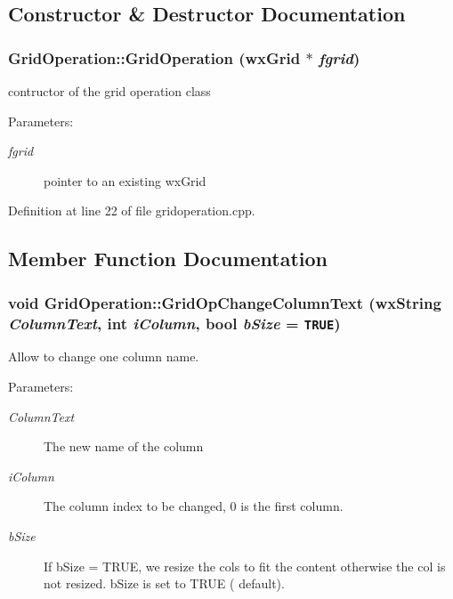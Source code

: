 \subsection{Constructor \& Destructor Documentation}
\subsubsection{\setlength{\rightskip}{0pt plus 5cm}Grid\-Operation::Grid\-Operation (wx\-Grid $\ast$ {\em fgrid})}\label{class_grid_operation_bf7693786c3ae789ff360491b1904b3c}


contructor of the grid operation class 

\begin{Desc}
\item[Parameters:]
\begin{description}
\item[{\em fgrid}]pointer to an existing wx\-Grid \end{description}
\end{Desc}


Definition at line 22 of file gridoperation.cpp.

\subsection{Member Function Documentation}
\subsubsection{\setlength{\rightskip}{0pt plus 5cm}void Grid\-Operation::Grid\-Op\-Change\-Column\-Text (wx\-String {\em Column\-Text}, int {\em i\-Column}, bool {\em b\-Size} = {\tt TRUE})}\label{class_grid_operation_d7fbf23501fb4af4755d1c993c666d00}


Allow to change one column name. 

\begin{Desc}
\item[Parameters:]
\begin{description}
\item[{\em Column\-Text}]The new name of the column \item[{\em i\-Column}]The column index to be changed, 0 is the first column. \item[{\em b\-Size}]If b\-Size = TRUE, we resize the cols to fit the content otherwise the col is not resized. b\-Size is set to TRUE ( default). \end{description}
\end{Desc}


